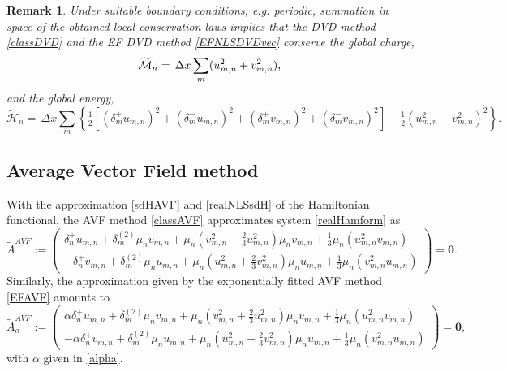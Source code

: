 \documentclass[twoside]{article}
\newtheorem{remark}{Remark}
\numberwithin{equation}{section}
\begin{document}
\begin{remark} 
Under suitable boundary conditions, e.g. periodic, summation in space of the obtained local conservation laws implies that the DVD method \eqref{classDVD} and the EF DVD method \eqref{EFNLSDVDvec} conserve the global charge,
\begin{equation}\label{totch}
\widetilde{\mathcal{M}}_n=\,\Delta x\sum_m (u_{m,n}^2+v_{m,n}^2),\\
\end{equation}
and the global energy,
\begin{equation}\label{totH}
\widetilde{\mathcal{H}}_n=\,\Delta x\sum_m \left\{\tfrac{1}2\left[(\delta_m^+u_{m,n})^2+(\delta_m^-u_{m,n})^2+(\delta_m^+v_{m,n})^2+(\delta_m^-v_{m,n})^2\right]-\tfrac{1}2(u_{m,n}^2+v_{m,n}^2)^2\right\}.
\end{equation}
\end{remark}
\subsection{Average Vector Field method}
With the approximation \eqref{sdHAVF} and \eqref{realNLSsdH} of the Hamiltonian functional, the AVF method \eqref{classAVF} approximates system \eqref{realHamform} as
\begin{equation}\label{NLSAVFvec}
\widetilde{A}^{AVF}:=\left(\begin{array}{c}
\delta_n^+u_{m,n}+\delta_m^{(2)}\mu_nv_{m,n}+\mu_n(v_{m,n}^2+\frac{2}3u_{m,n}^2)\mu_nv_{m,n}+\frac{1}3\mu_n(u_{m,n}^2v_{m,n})\\
-\delta_n^+v_{m,n}+\delta_m^{(2)}\mu_nu_{m,n}+\mu_n(u_{m,n}^2+\frac{2}3v_{m,n}^2)\mu_nu_{m,n}+\frac{1}3\mu_n(v_{m,n}^2u_{m,n})
\end{array}\right)=\mathbf{0}.
\end{equation}
Similarly, the approximation given by the exponentially fitted AVF method \eqref{EFAVF} amounts to
\begin{equation}\label{EFNLSAVFvec}
\widetilde{A}^{AVF}_\alpha:=\left(\begin{array}{c}
\alpha\delta_n^+u_{m,n}+\delta_m^{(2)}\mu_nv_{m,n}+\mu_n(v_{m,n}^2+\frac{2}3u_{m,n}^2)\mu_nv_{m,n}+\frac{1}3\mu_n(u_{m,n}^2v_{m,n})\\
-\alpha\delta_n^+v_{m,n}+\delta_m^{(2)}\mu_nu_{m,n}+\mu_n(u_{m,n}^2+\frac{2}3v_{m,n}^2)\mu_nu_{m,n}+\frac{1}3\mu_n(v_{m,n}^2u_{m,n})
\end{array}\right)=\mathbf{0},
\end{equation}
with $\alpha$ given in \eqref{alpha}.
\end{document}
